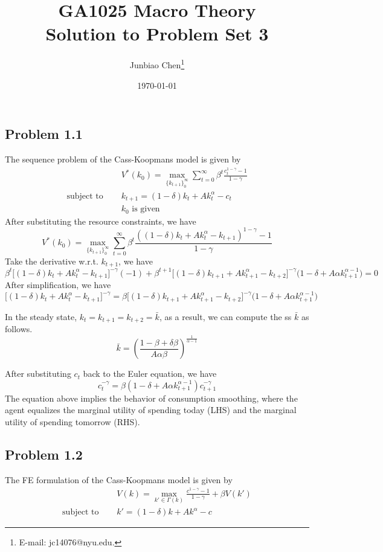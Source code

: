 \documentclass[11pt]{article}
\title{GA1025 Macro Theory \\Solution to Problem Set 3}
\author{
Junbiao Chen\thanks{E-mail: jc14076@nyu.edu.}
}
\date{\today}
\theoremstyle{definition}
\theoremstyle{boldtitle} %
\numberwithin{equation}{section}
\numberwithin{figure}{section}
\numberwithin{table}{section}
\begin{document}
\maketitle

\subsection*{Problem 1.1}
The sequence problem of the Cass-Koopmans model is given by 
\begin{align*}
    & V^*(k_0) = \max_{\{k_{t+1}\}_0^\infty} \sum_{t=0}^\infty \beta^t \frac{c_t^{1 - \gamma} - 1}{1 - \gamma} \\
    \text{subject to } \quad & k_{t+1} = (1 - \delta) k_t + A k_t^\alpha - c_t \\
    & k_0 \text{ is given }
\end{align*}
After substituting the resource constraints, we have 
\[
 V^*(k_0) = \max_{\{k_{t+1}\}_0^\infty} \sum_{t=0}^\infty \beta^t \frac{((1 - \delta) k_t + A k_t^\alpha - k_{t+1})^{1 - \gamma} - 1}{1 - \gamma}
\]
Take the derivative w.r.t. $k_{t+1}$, we have 
\[
\beta^t \bigg[ (1-\delta)k_t + Ak_t^\alpha - k_{t+1} \bigg]^{-\gamma} (-1) + \beta^{t+1} 
 \bigg[ (1-\delta)k_{t+1} + Ak_{t+1}^\alpha - k_{t+2} \bigg]^{-\gamma} \bigg(1 - \delta + A \alpha k_{t+1}^{\alpha - 1}\bigg) = 0
\]
After simplification, we have 
\[
\bigg[ (1-\delta)k_t + Ak_t^\alpha - k_{t+1} \bigg]^{-\gamma} = \beta
 \bigg[ (1-\delta)k_{t+1} + Ak_{t+1}^\alpha - k_{t+2} \bigg]^{-\gamma} \bigg(1 - \delta + A \alpha k_{t+1}^{\alpha - 1}\bigg)
\]

In the steady state, $k_t = k_{t+1} = k_{t+2} = \bar{k}$, as a result, we can compute the ss $\bar{k}$ as follows.
\[
\bar{k} = \left(\frac{1 - \beta + \delta \beta}{A \alpha \beta} \right)^{\frac{1}{\alpha - 1}}
\]

After substituting $c_t$ back to the Euler equation, we have 
\[
c_t^{-\gamma} = \beta (1 - \delta + A \alpha k_{t+1}^{\alpha - 1}) c_{t+1}^{-\gamma}
\]
The equation above implies the behavior of consumption smoothing, 
where the agent equalizes the marginal utility of spending today (LHS) and 
the marginal utility of spending tomorrow (RHS).


\subsection*{Problem 1.2}
The FE formulation of the Cass-Koopmans model is given by 
\begin{align*}
    & V(k) = \max_{k' \in \Gamma(k)} \frac{c^{1- \gamma} - 1}{1 - \gamma} + \beta V(k') \\
    \text{subject to } \quad & k' = (1 - \delta) k + A k^\alpha - c
\end{align*}
\end{document}
